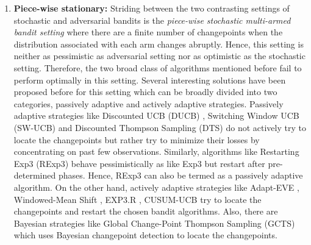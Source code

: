 \begin{enumerate}
\item \textbf{Piece-wise stationary:} Striding between the two contrasting settings of stochastic and adversarial bandits is the \textit{piece-wise stochastic multi-armed bandit setting} where there are a finite number of changepoints when the distribution associated with each arm changes abruptly. Hence, this setting is neither as pessimistic as adversarial setting nor as optimistic as the stochastic setting. Therefore, the two broad class of algorithms mentioned before fail to perform optimally in this setting. Several interesting solutions have been proposed before for this setting which can be broadly divided into two categories, passively adaptive and actively adaptive strategies. Passively adaptive strategies like Discounted UCB (DUCB) \citep{kocsis2006discounted}, Switching Window UCB (SW-UCB)  \citep{garivier2011upper} and Discounted Thompson Sampling (DTS) \citep{raj2017taming} do not actively try to locate the changepoints but rather try to minimize their losses by concentrating on past few observations. Similarly, algorithms like Restarting Exp3 (RExp3) \citep{DBLP:journals/corr/BesbesGZ14} behave pessimistically as like Exp3 but restart after pre-determined phases. Hence, RExp3 can also be termed as a passively adaptive algorithm. On the other hand, actively adaptive strategies like Adapt-EVE \citep{hartland2007change}, Windowed-Mean Shift \citep{yu2009piecewise}, EXP3.R \citep{allesiardo2017non}, CUSUM-UCB \citep{liu2017change} try to locate the changepoints and restart the chosen bandit algorithms. Also, there are Bayesian strategies like Global Change-Point Thompson Sampling (GCTS)\citep{mellor2013thompson} which uses Bayesian changepoint detection to locate the changepoints. 


\end{enumerate}




%


